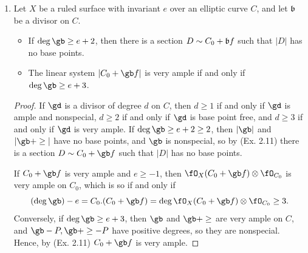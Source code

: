 \documentclass[a4paper]{article}
\begin{document}
\begin{enumerate} [label=\textbf{\arabic*.}, leftmargin=0em]
\begin{proof}
\begin{itemize} [leftmargin=0cm]
                        Hence, $D$ is very ample.
              \end{itemize}
          \end{proof}

    \item Let $X$ be a ruled surface with invariant $e$ over an elliptic curve $C$, and let $\mathfrak{b}$ be a divisor on $C$.
          \begin{itemize}
              \item[(a)] If $\deg{\gb} \geq e + 2$, then there is a section $D \sim C_0 + \mathfrak{b}f$ such that $|D|$ has no base points.
              \item[(b)] The linear system $|C_0 + \gb f|$ is very ample if and only if $\deg{\gb} \geq e + 3$.
          \end{itemize}

          \begin{proof}  If $\gd$ is a divisor of degree $d$ on $C$, then $d \geq 1$ if and only if $\gd$ is ample and nonspecial, $d\geq 2$ if and only if $\gd$ is base point free, and $d \geq 3$ if and only if $\gd$ is very ample.
              If $\deg{\gb} \geq e + 2 \geq 2$, then $|\gb|$ and $|\gb + \ge|$ have no base points, and $\gb$ is nonspecial, so by (Ex. 2.11) there is a section $D \sim C_0 + \gb f$ such that $|D|$ has no base points.

              If $C_0 + \gb f$ is very ample and $e \geq -1$, then $\fO_{X}(C_0 + \gb f) \otimes \fO_{C_0}$ is very ample on $C_0$, which is so if and only if
              \begin{equation*}
                  (\deg{\gb}) - e = C_0.(C_0 + \gb f) = \deg \fO_{X}(C_0 + \gb f) \otimes \fO_{C_0} \geq 3.
              \end{equation*}
              Conversely, if $\deg{\gb} \geq e + 3$, then $\gb$ and $\gb + \ge$ are very ample on $C$, and $\gb - P, \gb + \ge - P$ have positive degrees, so they are nonspecial.
              Hence, by (Ex. 2.11) $C_0 + \gb f$ is very ample.


\end{proof}
\end{enumerate}
\end{document}

